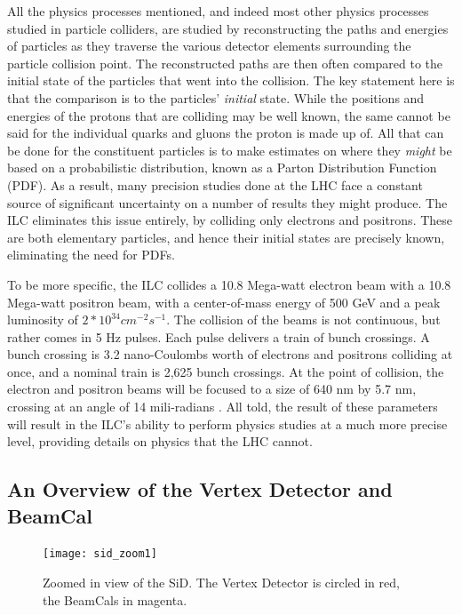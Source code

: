 \documentclass{report}
\begin{document}
                All the physics processes mentioned, and indeed most other physics processes studied in particle colliders, are studied by reconstructing the paths and energies of particles as they traverse the various detector elements surrounding the particle collision point. The reconstructed paths are then often compared to the initial state of the particles that went into the collision. The key statement here is that the comparison is to the particles' \textit{initial} state. While the positions and energies of the protons that are colliding may be well known, the same cannot be said for the individual quarks and gluons the proton is made up of. All that can be done for the constituent particles is to make estimates on where they \textit{might} be based on a probabilistic distribution, known as a Parton Distribution Function (PDF). As a result, many precision studies done at the LHC face a constant source of significant uncertainty on a number of results they might produce. The ILC eliminates this issue entirely, by colliding only electrons and positrons. These are both elementary particles, and hence their initial states are precisely known, eliminating the need for PDFs. 

                To be more specific, the ILC collides a 10.8 Mega-watt electron beam with a 10.8 Mega-watt positron beam, with a center-of-mass energy of 500 GeV and a peak luminosity of $ 2 * 10^{34} cm^{-2}s^{-1} $. The collision of the beams is not continuous, but rather comes in 5 Hz pulses. Each pulse delivers a train of bunch crossings. A bunch crossing is 3.2 nano-Coulombs worth of electrons and positrons colliding at once, and a nominal train is 2,625 bunch crossings. At the point of collision, the electron and positron beams will be focused to a size of 640 nm by 5.7 nm, crossing at an angle of 14 mili-radians \cite{beam_specs}. All told, the result of these parameters will result in the ILC's ability to perform physics studies at a much more precise level, providing details on physics that the LHC cannot.

            \subsection{An Overview of the Vertex Detector and BeamCal}
                \begin{figure}[h] 
                    \texttt{[image: sid\_zoom1]}
                    \centering
                    \caption{Zoomed in view of the SiD.
                        The Vertex Detector is circled in red,
                        the BeamCals in magenta.}
                    \label{fig__sid_zoom1}
                \end{figure}
\end{document}
